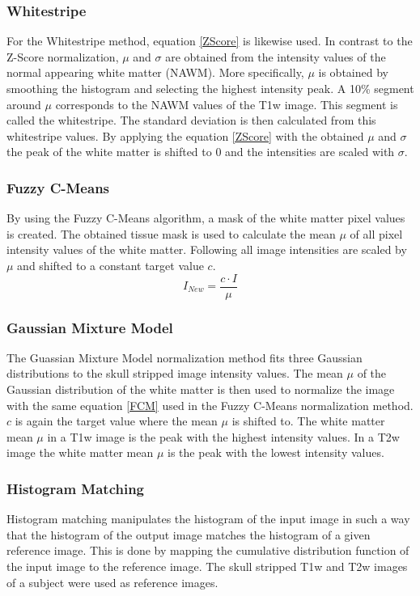 \documentclass[article]{IEEEtran}
\begin{document}
	\subsubsection{Whitestripe}
	For the Whitestripe method, equation \ref{ZScore} is likewise used. In contrast to the Z-Score normalization, $\mu$ and $\sigma$ are obtained from the intensity values of the normal appearing white matter (NAWM). 
	More specifically, $\mu$ is obtained by smoothing the histogram and selecting the highest intensity peak. A 10\% segment around $\mu$ corresponds to the NAWM values of the T1w image. This segment is called the whitestripe.
	The standard deviation is then calculated from this whitestripe values.
	By applying the equation \ref{ZScore} with the obtained $\mu$ and $\sigma$ the peak of the white matter is shifted to 0 and the intensities are scaled with $\sigma$.
	\smallskip
		
	\subsubsection{Fuzzy C-Means}
	By using the Fuzzy C-Means algorithm, a mask of the white matter pixel values is created. 
	The obtained tissue mask is used to calculate the mean $\mu$ of all pixel intensity values of the white matter.
	Following all image intensities are scaled by $\mu$ and shifted to a constant target value $c$.
		\begin{equation}\label{FCM}
			I_{New} = \frac{c \cdot I}{\mu}
		\end{equation}
	
	\subsubsection{Gaussian Mixture Model}
	The Guassian Mixture Model normalization method fits three Gaussian distributions to the skull stripped image intensity values. 
	The mean $\mu$ of the Gaussian distribution of the white matter is then used to normalize the image with the same equation \ref{FCM} used in the Fuzzy C-Means normalization method. 
	$c$ is again the target value where the mean $\mu$ is shifted to. 
	The white matter mean $\mu$ in a T1w image is the peak with the highest intensity values. 
	In a T2w image the white matter mean $\mu$ is the peak with the lowest intensity values. 
	\smallskip

	\subsubsection{Histogram Matching}
	Histogram matching manipulates the histogram of the input image in such a way that the histogram of the output image matches the histogram of a given reference image. 
	This is done by mapping the cumulative distribution function of the input image to the reference image.
	The skull stripped T1w and T2w images of a subject were used as reference images. 
	\smallskip
	
\end{document}
